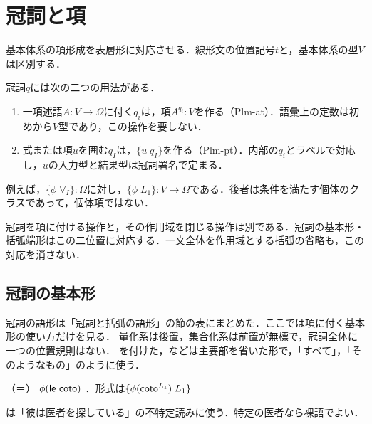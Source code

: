 \documentclass[../../main-detail.tex]{subfiles}
\begin{document}
\section{冠詞と項}\label{sec:practice-terms}
基本体系の項形成を表層形に対応させる．線形文の位置記号$t$と，基本体系の型$V$は区別する．
\begin{definition}[冠詞の二つの構文位置]
冠詞$q$には次の二つの用法がある．
\begin{enumerate}
 \item 一項述語$A:V\to\Omega$に付く$q_i$は，項$A^{q_i}:V$を作る（Plm-at）．語彙上の定数は初めから$V$型であり，この操作を要しない．
 \item 式または項$u$を囲む$q_I$は，$\{u\;q_I\}$を作る（Plm-pt）．内部の$q_i$とラベルで対応し，$u$の入力型と結果型は冠詞署名で定まる．
\end{enumerate}
例えば，$\{\phi\;\forall_I\}:\Omega$に対し，$\{\phi\;L_1\}:V\to\Omega$である．後者は条件を満たす個体のクラスであって，個体項ではない．
\end{definition}
\begin{remark}
冠詞を項に付ける操作と，その作用域を閉じる操作は別である．冠詞の基本形・括弧端形はこの二位置に対応する．一文全体を作用域とする括弧の省略も，この対応を消さない．
\end{remark}

\subsection{冠詞の基本形}
冠詞の語形は「冠詞と括弧の語形」の節の表にまとめた．ここでは項に付く基本形の使い方だけを見る．
量化系は後置，集合化系は前置が無標で，冠詞全体に一つの位置規則はない．
を付けた，などは主要部を省いた形で，「すべて」，「そのようなもの」のように使う．
\begin{exe}
    \ex {}\hfill {}
    \ex {}（＝）\hfill {}
    \ex {} $\phi(\textsf{le coto})$ \hfill {}．形式は$\{\phi(\textsf{coto}^{L_1})\; L_1\}$
    \ex {}\hfill {}
\end{exe}
は「彼は医者を探している」の不特定読みに使う．特定の医者なら裸語でよい．
\end{document}
